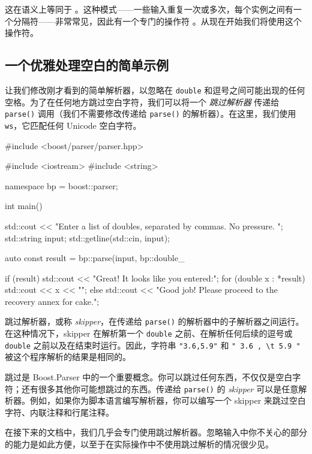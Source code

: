 这在语义上等同于 。这种模式——一些输入重复一次或多次，每个实例之间有一个分隔符——非常常见，因此有一个专门的操作符 。从现在开始我们将使用这个操作符。

\subsection{一个优雅处理空白的简单示例}

让我们修改刚才看到的简单解析器，以忽略在 \texttt{double} 和逗号之间可能出现的任何空格。为了在任何地方跳过空白字符，我们可以将一个 \emph{跳过解析器} 传递给 \texttt{parse()} 调用（我们不需要修改传递给 \texttt{parse()} 的解析器）。在这里，我们使用 \texttt{ws}，它匹配任何 Unicode 空白字符。

\begin{code}
#include <boost/parser/parser.hpp>

#include <iostream>
#include <string>


namespace bp = boost::parser;

int main()
{
    std::cout << "Enter a list of doubles, separated by commas.  No pressure. ";
    std::string input;
    std::getline(std::cin, input);

    auto const result = bp::parse(input, bp::double_ %

    if (result) {
        std::cout << "Great! It looks like you entered:\n";
        for (double x : *result) {
            std::cout << x << "\n";
        }
    } else {
        std::cout
            << "Good job!  Please proceed to the recovery annex for cake.\n";
    }
}
\end{code}

跳过解析器，或称 \emph{skipper}，在传递给 \texttt{parse()} 的解析器中的子解析器之间运行。在这种情况下，skipper 在解析第一个 \texttt{double} 之前、在解析任何后续的逗号或 \texttt{double} 之前以及在结束时运行。因此，字符串 \texttt{"3.6,5.9"} 和 \texttt{" 3.6 , \textbackslash{}t 5.9 "} 被这个程序解析的结果是相同的。

跳过是 Boost.Parser 中的一个重要概念。你可以跳过任何东西，不仅仅是空白字符；还有很多其他你可能想跳过的东西。传递给 \texttt{parse()} 的 \emph{skipper} 可以是任意解析器。例如，如果你为脚本语言编写解析器，你可以编写一个 skipper 来跳过空白字符、内联注释和行尾注释。

在接下来的文档中，我们几乎会专门使用跳过解析器。忽略输入中你不关心的部分的能力是如此方便，以至于在实际操作中不使用跳过解析的情况很少见。

